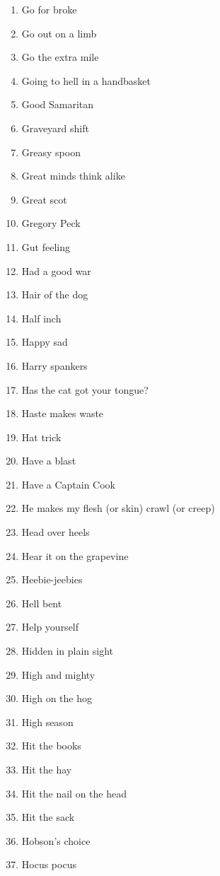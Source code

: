 \begin{enumerate}
        \item  Go for broke
        \item  Go out on a limb
        \item  Go the extra mile
        \item  Going to hell in a handbasket
        \item  Good Samaritan
        \item  Graveyard shift
        \item  Greasy spoon
        \item  Great minds think alike
        \item  Great scot
        \item  Gregory Peck
        \item  Gut feeling
        \item  Had a good war
        \item  Hair of the dog
        \item  Half inch
        \item  Happy sad
        \item  Harry spankers
        \item  Has the cat got your tongue?
        \item  Haste makes waste
        \item  Hat trick
        \item  Have a blast
        \item  Have a Captain Cook
        \item  He makes my flesh (or skin) crawl (or creep)
        \item  Head over heels
        \item  Hear it on the grapevine
        \item  Heebie-jeebies
        \item  Hell bent
        \item  Help yourself
        \item  Hidden in plain sight
        \item  High and mighty
        \item  High on the hog
        \item  High season
        \item  Hit the books
        \item  Hit the hay
        \item  Hit the nail on the head
        \item  Hit the sack
        \item  Hobson's choice
        \item  Hocus pocus

\end{enumerate}
